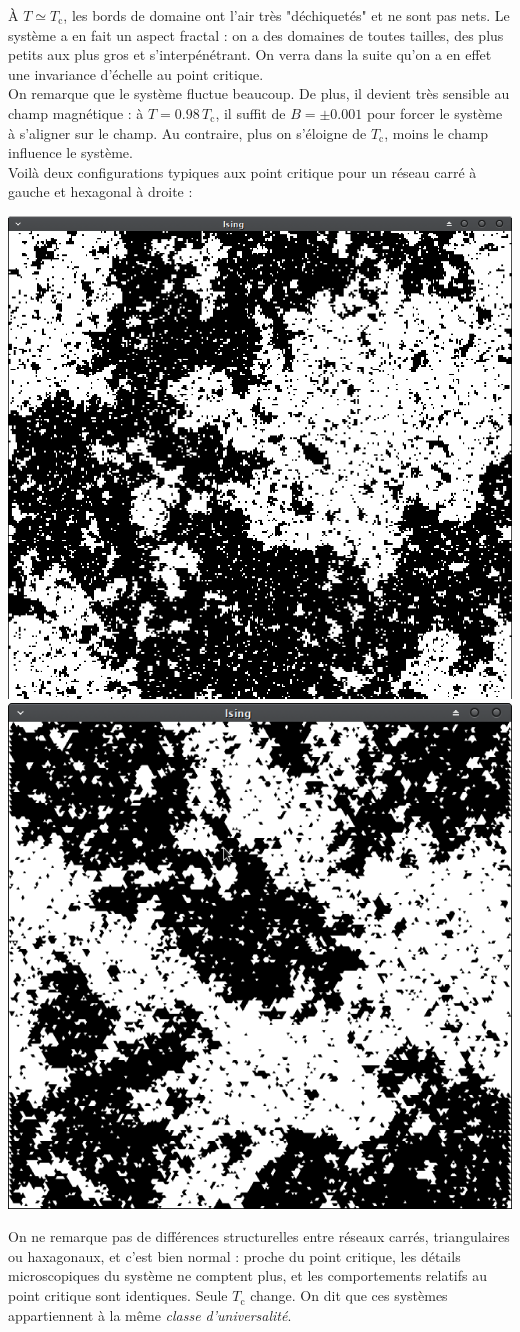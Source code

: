 \documentclass{book}
\begin{document}
\begin{correction}
À $T \simeq T_\text{c}$, les bords de domaine ont l'air très "déchiquetés" et ne sont pas nets. Le système a en fait un aspect fractal : on a des domaines de toutes tailles, des plus petits aux plus gros et s'interpénétrant. On verra dans la suite qu'on a en effet une invariance d'échelle au point critique.\\

On remarque que le système fluctue beaucoup. De plus, il devient très sensible au champ magnétique : à $T = 0.98 \, T_\text{c}$, il suffit de $B=\pm 0.001$ pour forcer le système à s'aligner sur le champ. Au contraire, plus on s'éloigne de $T_\text{c}$, moins le champ influence le système.\\

Voilà deux configurations typiques aux point critique pour un réseau carré à gauche et hexagonal à droite :
\begin{center}
\includegraphics[height=0.46\linewidth]{TD3/T_sur_Tc_1.0.png}
\includegraphics[height=0.46\linewidth]{TD3/T_sur_Tc_1.0_hexa.png}
\end{center}
On ne remarque pas de différences structurelles entre réseaux carrés, triangulaires ou haxagonaux, et c'est bien normal : proche du point critique, les détails microscopiques du système ne comptent plus, et les comportements relatifs au point critique sont identiques. Seule $T_\text{c}$ change. On dit que ces systèmes appartiennent à la même \emph{classe d'universalité}.
\end{correction}
\end{document}
